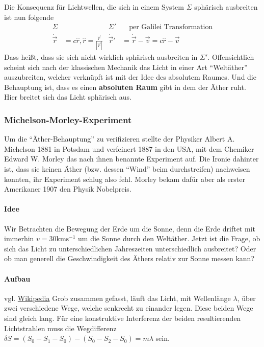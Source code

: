 \documentclass[oneside]{book}
\theoremstyle{definition}
\newcommand{\dotvec}[1]{\dot{\vec{#1}}}
\begin{document}
Die Konsequenz für Lichtwellen, die sich in einem System $\Sigma$ sphärisch ausbreiten ist nun folgende
\begin{align*}
	\Sigma& & \Sigma'& \text{~~~per Galilei Transformation}\\
	\dotvec{r} &= c \hat{r}, \hat{r} = \frac{\vec{r}}{|\vec{r}|} & \dotvec{r}' &= \dotvec{r} - \vec{v} = c \hat{r} - \vec{v}   
\end{align*}
Dass heißt, dass sie sich nicht wirklich sphärisch ausbreiten in $\Sigma'$. Offensichtlich scheint sich nach der klassischen Mechanik das Licht in einer Art "`Weltäther"' auszubreiten, welcher verknüpft ist mit der Idee des absolutem Raumes. Und die Behauptung ist, dass es einen \textbf{absoluten Raum} gibt in dem der Äther ruht. Hier breitet sich das Licht sphärisch aus.

\subsubsection{Michelson-Morley-Experiment}
Um die "`Äther-Behauptung"' zu verifizieren stellte der Physiker Albert A. Michelson 1881 in Potsdam und verfeinert 1887 in den USA, mit dem Chemiker Edward W. Morley das nach ihnen benannte Experiment auf. Die Ironie dahinter ist, dass sie keinen Äther (bzw. dessen "`Wind"' beim durchstreifen) nachweisen konnten, ihr Experiment schlug also fehl. Morley bekam dafür aber als erster Amerikaner 1907 den Physik Nobelpreis.

\paragraph{Idee} Wir Betrachten die Bewegung der Erde um die Sonne, denn die Erde driftet mit immerhin $v = 30 \mathrm{km}\mathrm{s}^{-1}$ um die Sonne durch den Weltäther. Jetzt ist die Frage, ob sich das Licht zu unterschiedlichen Jahreszeiten unterschiedlich ausbreitet? Oder ob man generell die Geschwindigkeit des Äthers relativ zur Sonne messen kann?

\paragraph{Aufbau} vgl. \href{https://de.wikipedia.org/wiki/Michelson-Morley-Experiment}{Wikipedia}
Grob zusammen gefasst, läuft das Licht, mit Wellenlänge $\lambda$, über zwei verschiedene Wege, welche senkrecht zu einander legen. Diese beiden Wege sind gleich lang. Für eine konstruktive Interferenz der beiden resultierenden Lichtstrahlen muss die Wegdifferenz $\delta S = (S_0 - S_1 - S_0) - (S_0 - S_2 - S_0) = m \lambda$ sein.
\end{document}
